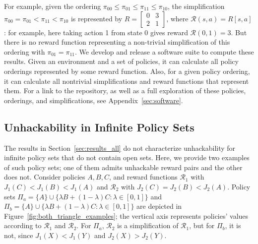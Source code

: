 \documentclass{article}
\theoremstyle{definition}
\theoremstyle{remark}
\begin{document}
For example, given the ordering $\pi_{00} \leq \pi_{01} \leq \pi_{11} \leq \pi_{10}$,
the simplification $\pi_{00} = \pi_{01} < \pi_{11} < \pi_{10}$ is represented
by $R = \left[\begin{smallmatrix} 0 & 3 \\ 2 & 1\end{smallmatrix}\right]$, where $\mathcal{R}(s, a) = R[s, a]$: for example, here taking action 1 from state 0 gives reward $\mathcal{R}(0, 1) = 3$.
But there is no reward function representing a non-trivial simplification of this ordering with $\pi_{01} = \pi_{11}$.
We develop and release a software suite to compute these results.
Given an environment and a set of policies, it can calculate all policy orderings represented by some reward function. 
Also, for a given policy ordering, it can calculate all nontrivial simplifications and reward functions that represent them.
For a link to the repository, as well as a full exploration of these policies, orderings, and simplifications, see Appendix~\ref{sec:software}.


\subsection{Unhackability in Infinite Policy Sets}\label{sec:results_infinite}
The results in Section~\ref{sec:results_all} do not characterize unhackability for infinite policy sets that do not contain open sets. 
Here, we provide two examples of such policy sets; one of them admits unhackable reward pairs and the other does not.
Consider policies $A,B,C$, and reward functions $\mathcal{R}_1$ with $J_1(C) < J_1(B) < J_1(A)$ and $\mathcal{R}_2$ with $J_2(C) = J_2(B) < J_2(A)$.
Policy sets $\Pi_a = \{ A \} \cup \{ \lambda B + (1 - \lambda) C  : \lambda \in [0, 1]\}$ and $\Pi_b = \{ A \} \cup \{ \lambda B + (1 - \lambda) C  : \lambda \in [0, 1]\}$ are depicted in Figure~\ref{fig:both_triangle_examples}; the vertical axis represents policies' values according to $\mathcal{R}_1$ and $\mathcal{R}_2$.
For $\Pi_a$, $\mathcal{R}_2$ is a simplification of $\mathcal{R}_1$, but 
for $\Pi_b$, it is not, since $J_1(X) < J_1(Y)$ and $J_2(X) > J_2(Y)$.
\end{document}
